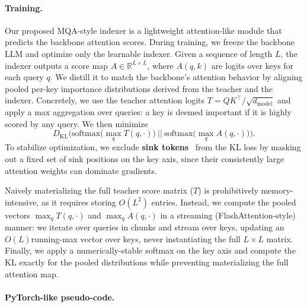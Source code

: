 
\paragraph{Training.}
Our proposed MQA-style indexer is a lightweight attention-like module that predicts the backbone attention scores. During training, we freeze the backbone LLM and optimize only the learnable indexer. Given a sequence of length $L$, the indexer outputs a score map $A\in\mathbb{R}^{L\times L}$, where $A(q,k)$ are logits over keys for each query $q$. We distill it to match the backbone’s attention behavior by aligning pooled per-key importance distributions derived from the teacher and the indexer. Concretely, we use the teacher attention logits $T = QK^\top/\sqrt{d_{\text{model}}}$ and apply a max aggregation over queries: a key is deemed important if it is highly scored by any query. We then minimize
$$
D_{\mathrm{KL}}\Big(\mathrm{softmax}\big(\max_{q} T(q,\cdot)\big)\ \Big|\Big|\ 
\mathrm{softmax}\big(\max_{q} A(q,\cdot)\big)\Big).
$$
To stabilize optimization, we exclude \textbf{sink tokens}~\citep{xiao2023efficient} from the KL loss by masking out a fixed set of sink positions on the key axis, since their consistently large attention weights can dominate gradients.

Naively materializing the full teacher score matrix ($T$) is prohibitively memory-intensive, as it requires storing $O(L^2)$ entries. Instead, we compute the pooled vectors $\max_q T(q,\cdot)$ and $\max_q A(q,\cdot)$ in a streaming (FlashAttention-style) manner: we iterate over queries in chunks and stream over keys, updating an$O(L)$running-max vector over keys, never instantiating the full $L\times L$ matrix. Finally, we apply a numerically-stable softmax on the key axis and compute the KL exactly for the pooled distributions while preventing materializing the full attention map.


\paragraph{PyTorch-like pseudo-code.}
\renewcommand{\thealgorithm}{} %

